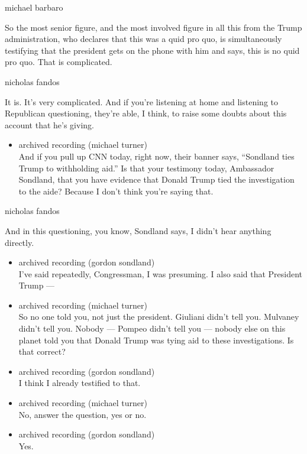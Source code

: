 michael barbaro

So the most senior figure, and the most involved figure in all this from
the Trump administration, who declares that this was a quid pro quo, is
simultaneously testifying that the president gets on the phone with him
and says, this is no quid pro quo. That is complicated.

nicholas fandos

It is. It's very complicated. And if you're listening at home and
listening to Republican questioning, they're able, I think, to raise
some doubts about this account that he's giving.

\begin{itemize}
\tightlist
\item
  archived recording (michael turner)\\
  And if you pull up CNN today, right now, their banner says, ``Sondland
  ties Trump to withholding aid.'' Is that your testimony today,
  Ambassador Sondland, that you have evidence that Donald Trump tied the
  investigation to the aide? Because I don't think you're saying that.
\end{itemize}

nicholas fandos

And in this questioning, you know, Sondland says, I didn't hear anything
directly.

\begin{itemize}
\item
  archived recording (gordon sondland)\\
  I've said repeatedly, Congressman, I was presuming. I also said that
  President Trump ---
\item
  archived recording (michael turner)\\
  So no one told you, not just the president. Giuliani didn't tell you.
  Mulvaney didn't tell you. Nobody --- Pompeo didn't tell you --- nobody
  else on this planet told you that Donald Trump was tying aid to these
  investigations. Is that correct?
\item
  archived recording (gordon sondland)\\
  I think I already testified to that.
\item
  archived recording (michael turner)\\
  No, answer the question, yes or no.
\item
  archived recording (gordon sondland)\\
  Yes.
\end{itemize}

